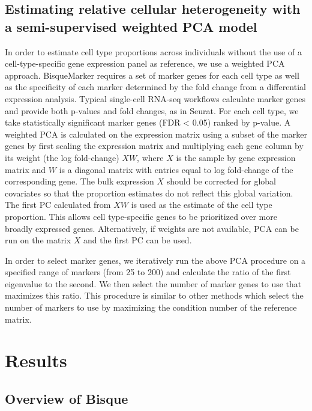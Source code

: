 \subsection{Estimating relative cellular heterogeneity with a semi-supervised weighted PCA model}

In order to estimate cell type proportions across individuals without the use of a cell-type-specific gene expression panel as reference, we use a weighted PCA approach. BisqueMarker requires a set of marker genes for each cell type as well as the specificity of each marker determined by the fold change from a differential expression analysis. Typical single-cell RNA-seq workflows calculate marker genes and provide both p-values and fold changes, as in Seurat\cite{Butler2018-mj}. For each cell type, we take statistically significant marker genes (FDR < 0.05) ranked by p-value. A weighted PCA is calculated on the expression matrix using a subset of the marker genes by first scaling the expression matrix and multiplying each gene column by its weight (the log fold-change) $XW$, where $X$ is the sample by gene expression matrix and $W$ is a diagonal matrix with entries equal to log fold-change of the corresponding gene. The bulk expression $X$ should be corrected for global covariates so that the proportion estimates do not reflect this global variation. The first PC calculated from $XW$ is used as the estimate of the cell type proportion. This allows cell type-specific genes to be prioritized over more broadly expressed genes. Alternatively, if weights are not available, PCA can be run on the matrix $X$ and the first PC can be used.

In order to select marker genes, we iteratively run the above PCA procedure on a specified range of markers (from 25 to 200) and calculate the ratio of the first eigenvalue to the second. We then select the number of marker genes to use that maximizes this ratio. This procedure is similar to other methods which select the number of markers to use by maximizing the condition number of the reference matrix\cite{Mohammadi2017-rw}. 

\section{Results}
\subsection{Overview of Bisque}

